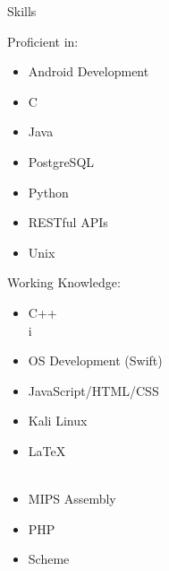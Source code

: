 \documentclass{res}
\begin{document}
\begin{resume}
{\huge Skills}\\[2mm]
\begin{minipage}{0.45\textwidth}
	\vspace{-5mm}
	{\Large Proficient in:}\\
		\begin{itemize}[noitemsep,nolistsep]
			\vspace{-3mm}
			\item Android Development\\
			\vspace{-3mm}
			\item C\\
			\vspace{-3mm}
			\item Java\\
			\vspace{-3mm}
			\item PostgreSQL\\
			\vspace{-3mm}
			\item Python\\
			\vspace{-3mm}
			\item RESTful APIs\\
			\vspace{-3mm}
			\item Unix\\
		\end{itemize}
\end{minipage}
\begin{minipage}{0.45\textwidth}
	\vspace{1mm}
	{\Large Working Knowledge:}\\
		\begin{itemize}[noitemsep,nolistsep]
			\vspace{-3mm}
			\item C++\\
			\vspace{-3mm}
			i\item OS Development (Swift)\\
			\vspace{-3mm}
			\item JavaScript/HTML/CSS\\
			\vspace{-3mm}
			\item Kali Linux\\
			\vspace{-3mm}
			\item \LaTeX\\\
			\vspace{-3mm}
			\item MIPS Assembly\\
			\vspace{-3mm}
			\item PHP\\
			\vspace{-3mm}
			\item Scheme\\
		\end{itemize}
\end{minipage}
\vspace{-1mm}


\end{resume}
\end{document}
